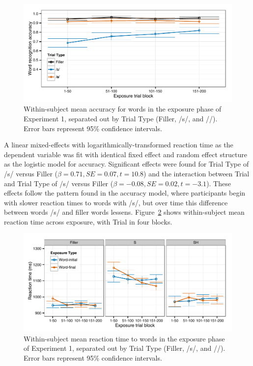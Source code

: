 \begin{figure}[!ht]
\caption{Within-subject mean accuracy for words in the exposure phase of Experiment 1, separated out by Trial Type (Filler, /s/, and /\textesh/). Error bars represent 95\% confidence intervals.}
\label{fig:exp2exposeacc}
\begin{center}
\includegraphics[width=\textwidth]{graphs/exp1_expacc}
\end{center}
\end{figure}

A linear mixed-effects with logarithmically-transformed reaction time as the dependent variable was fit with identical fixed effect and random effect structure as the logistic model for accuracy.
Significant effects were found for Trial Type of /s/ versus Filler ($\beta = 0.71, SE = 0.07, t = 10.8$) and the interaction between Trial and Trial Type of /s/ versus Filler ($\beta = -0.08, SE = 0.02, t = -3.1$).  
These effects follow the pattern found in the accuracy model, where participants begin with slower reaction times to words with /s/, but over time this difference between words /s/ and filler words lessens.  
Figure~\ref{fig:exp2exposert} shows within-subject mean reaction time across exposure, with Trial in four blocks.

\begin{figure}[!ht]
\caption{Within-subject mean reaction time to words in the exposure phase of Experiment 1, separated out by Trial Type (Filler, /s/, and /\textesh/). Error bars represent 95\% confidence intervals.}
\label{fig:exp2exposert}
\begin{center}
\includegraphics[width=\textwidth]{graphs/exp1_exprt}
\end{center}
\end{figure}

